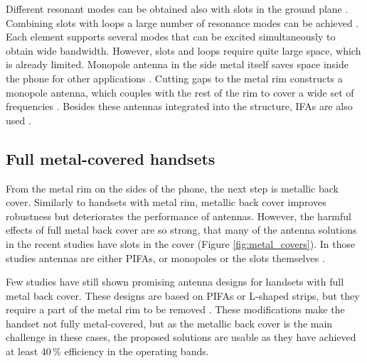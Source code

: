 Different resonant modes can be obtained also with slots in the ground plane \cite{yuan_slot}. Combining slots with loops a large number of resonance modes can be achieved \cite{hsu_compact}. Each element supports several modes that can be excited simultaneously to obtain wide bandwidth. However, slots and loops require quite large space, which is already limited. Monopole antenna in the side metal itself saves space inside the phone for other applications \cite{lee_monopole, valkonen_multifeed}. Cutting gaps to the metal rim constructs a monopole antenna, which couples with the rest of the rim to cover a wide set of frequencies \cite{chen_metal_frame}. Besides these antennas integrated into the structure, IFAs are also used \cite{hepta_ifa}. %

\subsection{Full metal-covered handsets}
\label{sec:full_cover}
From the metal rim on the sides of the phone, the next step is metallic back cover. Similarly to handsets with metal rim, metallic back cover improves robustness but deteriorates the performance of antennas. However, the harmful effects of full metal back cover are so strong, that many of the antenna solutions in the recent studies have slots in the cover (Figure \ref{fig:metal_covers}). In those studies antennas are either PIFAs, or monopoles or the slots themselves \cite{wu_pier, son_wideband_mimo, wu_tunable, zhong_pier}. 

Few studies have still shown promising antenna designs for handsets with full metal back cover. These designs are based on PIFAs or L-shaped strips, but they require a part of the metal rim to be removed \cite{chen_compact_lte, wu_pier}. These modifications make the handset not fully metal-covered, but as the metallic back cover is the main challenge in these cases, the proposed solutions are usable as they have achieved at least 40\,\% efficiency in the operating bands. %

